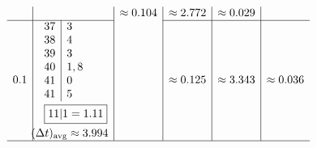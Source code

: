 \documentclass[12pt, A4]{article}
\newcommand{\avg}[1]{#1_{\mathrm{avg}}}
\begin{document}
\[\begin{array}{c|c|c|c|c|c}
\begin{aligned}
					\end{aligned} &&
					\approx 0.104 & 
					\approx 2.772 &
					\approx 0.029 \\\cline{1-2} \cline{4-6}
				0.1 &
					\begin{aligned}
						&\begin{array}{r|l}
							37 & 3 \\
							38 & 4 \\
							39 & 3 \\
							40 & 1, 8 \\
							41 & 0 \\
							41 & 5
						\end{array} \\
						&\hspace{1.8mm}\boxed{11|1 = 1.11} \\
						&\hspace{-2.3mm}\avg{(\Delta t)} \approx 3.994
					\end{aligned} &&
					\approx 0.125 &
					\approx 3.343 &
					\approx 0.036 \\\hline
			\end{array}\]
\end{document}
